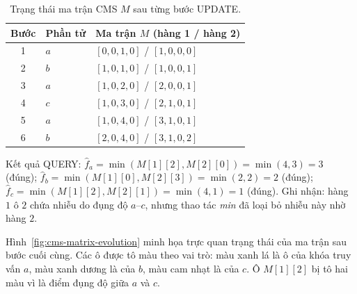 \begin{table}[H]
  \centering
  \caption{Trạng thái ma trận CMS $M$ sau từng bước UPDATE.}
  \label{tab:cms-trace}
  \begin{tabular}{@{}c l l@{}}
    \toprule
    \textbf{Bước} & \textbf{Phần tử} & \textbf{Ma trận $M$ (hàng 1 / hàng 2)} \\
    \midrule
    1 & $a$ & $[0,0,1,0]$ / $[1,0,0,0]$ \\
    2 & $b$ & $[1,0,1,0]$ / $[1,0,0,1]$ \\
    3 & $a$ & $[1,0,2,0]$ / $[2,0,0,1]$ \\
    4 & $c$ & $[1,0,3,0]$ / $[2,1,0,1]$ \\
    5 & $a$ & $[1,0,4,0]$ / $[3,1,0,1]$ \\
    6 & $b$ & $[2,0,4,0]$ / $[3,1,0,2]$ \\
    \bottomrule
  \end{tabular}
\end{table}

Kết quả QUERY: $\hat{f}_a = \min(M[1][2], M[2][0]) = \min(4, 3) = 3$ (đúng); $\hat{f}_b = \min(M[1][0], M[2][3]) = \min(2, 2) = 2$ (đúng); $\hat{f}_c = \min(M[1][2], M[2][1]) = \min(4, 1) = 1$ (đúng). Ghi nhận: hàng $1$ ô $2$ chứa nhiễu do đụng độ $a$--$c$, nhưng thao tác \textit{min} đã loại bỏ nhiễu này nhờ hàng $2$.

Hình~\ref{fig:cms-matrix-evolution} minh họa trực quan trạng thái của ma trận sau bước cuối cùng. Các ô được tô màu theo vai trò: màu xanh lá là ô của khóa truy vấn $a$, màu xanh dương là của $b$, màu cam nhạt là của $c$. Ô $M[1][2]$ bị tô hai màu vì là điểm đụng độ giữa $a$ và $c$.

